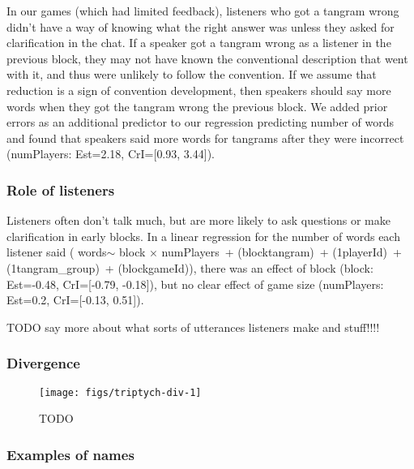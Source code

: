 \documentclass[
  english,
  a4paper,
]{article}
\begin{document}
In our games (which had limited feedback), listeners who got a tangram wrong didn't have a way of knowing what the right answer was unless they asked for clarification in the chat. If a speaker got a tangram wrong as a listener in the previous block, they may not have known the conventional description that went with it, and thus were unlikely to follow the convention. If we assume that reduction is a sign of convention development, then speakers should say more words when they got the tangram wrong the previous block. We added prior errors as an additional predictor to our regression predicting number of words and found that speakers said more words for tangrams after they were incorrect (numPlayers: Est=2.18, CrI={[}0.93, 3.44{]}).

\hypertarget{role-of-listeners}{%
\subsubsection{Role of listeners}\label{role-of-listeners}}

Listeners often don't talk much, but are more likely to ask questions or make clarification in early blocks. In a linear regression for the number of words each listener said ( words\(\sim\) block \(\times\) numPlayers~+ (block\textbar tangram)~+ (1\textbar playerId)~+ (1\textbar tangram\_group)~+ (block\textbar gameId)), there was an effect of block (block: Est=-0.48, CrI={[}-0.79, -0.18{]}), but no clear effect of game size (numPlayers: Est=0.2, CrI={[}-0.13, 0.51{]}).

TODO say more about what sorts of utterances listeners make and stuff!!!!

\hypertarget{divergence}{%
\subsubsection{Divergence}\label{divergence}}

\begin{figure*}[t!]

{\centering \texttt{[image: figs/triptych-div-1]} 

}

\caption{TODO}\label{fig:triptych-div}
\end{figure*}

\hypertarget{examples-of-names}{%
\subsubsection{Examples of names}\label{examples-of-names}}
\end{document}
